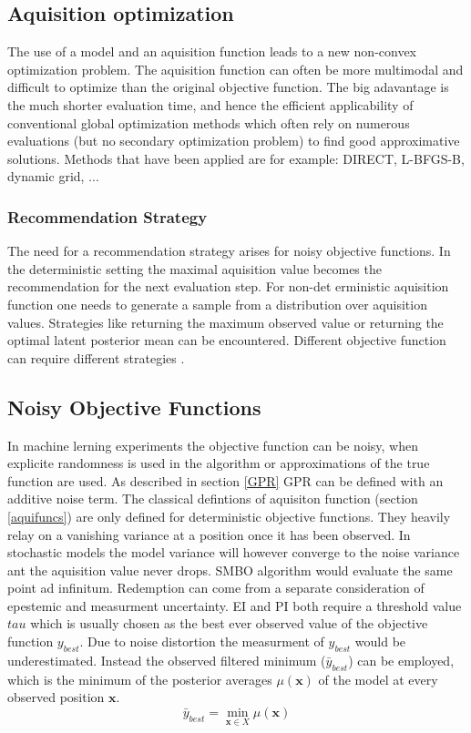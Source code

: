 \documentclass[english]{article}
\newcommand{\x}{\mathbf{x}}
\begin{document}
\subsection*{Aquisition optimization}
The use of a model and an aquisition function leads to a new non-convex optimization problem. The aquisition function can often be more multimodal and difficult to optimize than the original objective function. The big adavantage is the much shorter evaluation time, and hence the efficient applicability of conventional global optimization methods which often rely on numerous evaluations (but no secondary optimization problem) to find good approximative solutions.
Methods that have been applied are for example: DIRECT, L-BFGS-B, dynamic grid, ...

\subsubsection*{Recommendation Strategy}
The need for a recommendation strategy arises for noisy objective functions. In the deterministic setting the maximal aquisition value becomes the recommendation for the next evaluation step. For non-det erministic aquisition function one needs to generate a sample from a distribution over aquisition values. Strategies like returning the maximum observed value or returning the optimal latent posterior mean can be encountered. Different objective function can require different strategies \cite{hoffman_modular_2014}.

\subsection{Noisy Objective Functions}
In machine lerning experiments the objective function can be noisy, when explicite randomness is used in the algorithm or approximations of the true function are used. As described in section \ref{GPR} GPR can be defined with an additive noise term. The classical defintions of aquisiton function (section \ref{aquifuncs}) are only defined for deterministic objective functions. They heavily relay on a vanishing variance at a position once it has been observed.  In stochastic models the model variance will however converge to the noise variance ant the aquisition value never drops. SMBO algorithm would evaluate the same point ad infinitum. Redemption can come from a separate consideration of epestemic and measurment uncertainty.
EI and PI both require a threshold value $tau$ which is usually chosen as the best ever observed value of the objective function $y_{best}$. Due to noise distortion the measurment of $y_{best}$ would be underestimated.  Instead the observed filtered minimum ($\bar{y}_{best}$) can be employed, which is the minimum of the posterior averages $\mu(\x)$ of the model at every observed position $\x$.
\begin{equation}
  \bar{y}_{best} = \min_{\x \in X} \mu(\x)
\end{equation}
\end{document}
